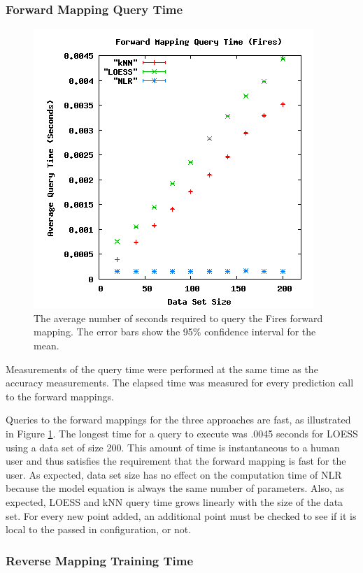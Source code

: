 \subsubsection{Forward Mapping Query Time}
\begin{figure}[ht]
\centering
\includegraphics[scale=.5]{images/results_fires/fmquery.png}
\caption{The average number of seconds required to query the Fires forward mapping.
The error bars show the 95\% confidence interval for the mean.}
\label{fig:firefmquery}
\end{figure}

Measurements of the query time were performed at the same time as the accuracy measurements.
The elapsed time was measured for every prediction call to the forward mappings.

Queries to the forward mappings for the three approaches are fast, as illustrated in Figure \ref{fig:firefmquery}.
The longest time for a query to execute was .0045 seconds for LOESS using a data set of size 200.
This amount of time is instantaneous to a human user and thus satisfies the requirement that the forward mapping is fast for the user.
As expected, data set size has no effect on the computation time of NLR because the model equation is always the same number of parameters.
Also, as expected, LOESS and kNN query time grows linearly with the size of the data set.
For every new point added, an additional point must be checked to see if it is local to the passed in configuration, or not.


\subsubsection{Reverse Mapping Training Time}

